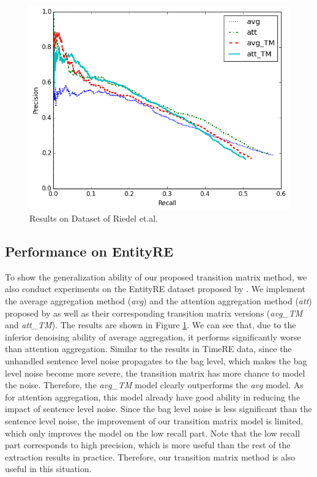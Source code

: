 \begin{figure}[htbp]
\includegraphics[width=0.9\linewidth]{figures/re_att_avg_cmp_exp.png}
\caption{Results on Dataset of Riedel et.al.}
\label{fig: Riedel_res}
\end{figure}

\subsection{Performance on EntityRE}
To show the generalization ability of our proposed transition matrix method, we also conduct experiments on the EntityRE dataset proposed by \cite{riedel2010modeling}. We implement the average aggregation method (\emph{avg}) and the attention aggregation method (\emph{att}) proposed by \cite{lin2016neural} as well as their corresponding transition matrix versions (\emph{avg\_TM} and \emph{att\_TM}). The results are shown in Figure \ref{fig: Riedel_res}. We can see that, due to the inferior denoising ability of average aggregation, it performs significantly worse than attention aggregation. Similar to the results in TimeRE data, since the unhandled sentence level noise propagates to the bag level, which makes the bag level noise become more severe, the transition matrix has more chance to model the noise. Therefore, the \emph{avg\_TM} model clearly outperforms the \emph{avg} model. As for attention aggregation, this model already have good ability in reducing the impact of sentence level noise. Since the bag level noise is less significant than the sentence level noise, the improvement of our transition matrix model is limited, which only improves the model on the low recall part. Note that the low recall part corresponds to high precision, which is more useful than the rest of the extraction results in practice. Therefore, our transition matrix method is also useful in this situation.


